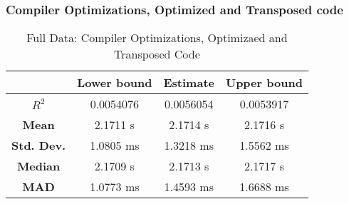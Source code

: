 \subsubsection{Compiler Optimizations, Optimized and Transposed code}
\begin{table}[H]
\centering
\begin{tabular}{|c|c|c|c|}
\hline
\textbf{} & \textbf{Lower bound} & \textbf{Estimate} & \textbf{Upper bound} \\
\hline
\textbf{$R^2$} & 0.0054076 & 0.0056054 & 0.0053917 \\
\hline
\textbf{Mean} & 2.1711 s & 2.1714 s & 2.1716 s \\
\hline
\textbf{Std. Dev.} & 1.0805 ms & 1.3218 ms & 1.5562 ms \\
\hline
\textbf{Median} & 2.1709 s & 2.1713 s & 2.1717 s \\
\hline
\textbf{MAD} & 1.0773 ms & 1.4593 ms & 1.6688 ms \\
\hline
\end{tabular}
\caption{Full Data: Compiler Optimizations, Optimizaed and Transposed Code}
\end{table}

